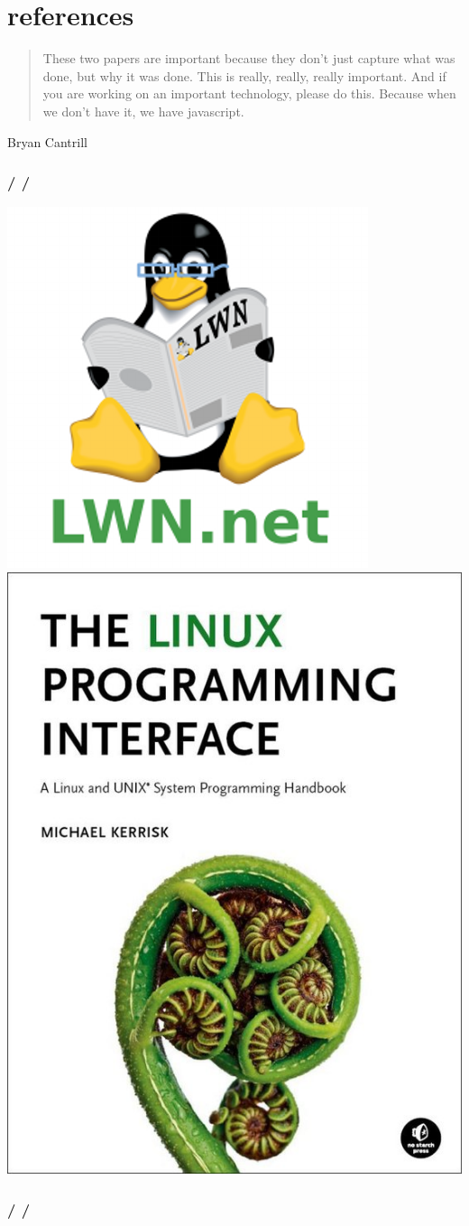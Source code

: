 \documentclass{beamer}
\newcommand{\autotitle}
{\frametitle{
    \secname
    \ifx\insertsubsection\empty
    \else
        /\subsecname
        \ifx\insertsubsubsection\empty\else/\subsubsecname\fi
    \fi}}
\begin{document}
\section{references}

\begin{frame}
    \begin{quote}
        These two papers are important because they don't just capture what was
        done, but why it was done.  This is really, really, really important.
        And if you are working on an important technology, please do this.
        Because when we don't have it, we have javascript.
    \end{quote}
    Bryan Cantrill \cite{cantrill_jails_zones}
\end{frame}

\begin{frame}
    \autotitle
    \includegraphics[width=.4\linewidth]{img/lwn.png}
    ~~
    \cite{lwn}
    ~~
    \includegraphics[width=.4\linewidth]{img/tlpi.jpg}
    \cite{tlpi}
\end{frame}

\begin{frame}[allowframebreaks]
    \autotitle
\end{frame}
\end{document}
